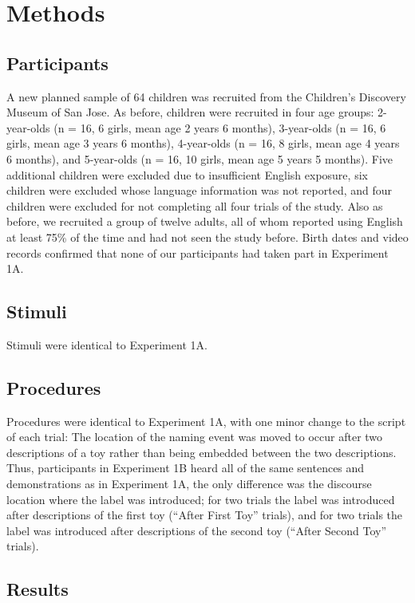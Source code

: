 \documentclass[man]{apa2}
\begin{document}
\section{Methods}

\subsection{Participants}

A new planned sample of 64 children was recruited from the Children's Discovery Museum of San Jose. As before, children were recruited in four age groups: 2-year-olds (n = 16, 6 girls, mean age 2 years 6 months), 3-year-olds  (n = 16, 6 girls, mean age 3 years 6 months), 4-year-olds (n = 16, 8 girls, mean age 4 years 6 months), and 5-year-olds (n = 16, 10 girls, mean age 5 years 5 months).  Five additional children were excluded due to insufficient English exposure, six children were excluded whose language information was not reported, and four children were excluded for not completing all four trials of the study.  Also as before, we recruited a group of twelve adults, all of whom reported using English at least 75\% of the time and had not seen the study before.  Birth dates and video records confirmed that none of our participants had taken part in Experiment 1A. 

\subsection{Stimuli}

Stimuli were identical to Experiment 1A. 

\subsection{Procedures}

Procedures were identical to Experiment 1A, with one minor change to the script of each trial: The location of the naming event was moved to occur after two descriptions of a toy rather than being embedded between the two descriptions. Thus, participants in Experiment 1B heard all of the same sentences and demonstrations as in Experiment 1A, the only difference was the discourse location where the label was introduced; for two trials the label was introduced after descriptions of the first toy (``After First Toy'' trials), and for two trials the label was introduced after descriptions of the second toy (``After Second Toy'' trials).  

\subsection{Results}
\end{document}
